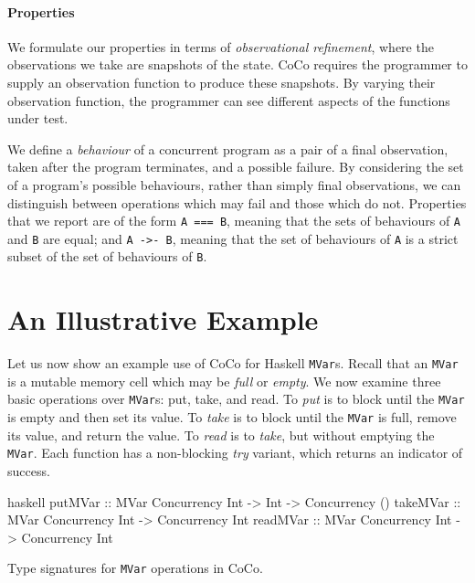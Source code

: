 \paragraph{Properties}
We formulate our properties in terms of \emph{observational
  refinement}\cite{he1986}, where the observations we take are
snapshots of the state.  CoCo requires the programmer to supply an
observation function to produce these snapshots.  By varying their
observation function, the programmer can see different aspects of the
functions under test.

We define a \emph{behaviour} of a concurrent program as a pair of a
final observation, taken after the program terminates, and a possible
failure.  By considering the set of a program's possible behaviours,
rather than simply final observations, we can distinguish between
operations which may fail and those which do not.  Properties that we
report are of the form \verb|A === B|, meaning that the sets of
behaviours of \verb|A| and \verb|B| are equal; and \verb|A ->- B|,
meaning that the set of behaviours of \verb|A| is a strict subset of
the set of behaviours of \verb|B|.

\section{An Illustrative Example}
\label{sec:coco-example}

Let us now show an example use of CoCo for Haskell \verb|MVar|s.
Recall that an \verb|MVar| is a mutable memory cell which may be
\emph{full} or \emph{empty}.  We now examine three basic operations
over \verb|MVar|s: put, take, and read.  To \emph{put} is to block
until the \verb|MVar| is empty and then set its value.  To \emph{take}
is to block until the \verb|MVar| is full, remove its value, and
return the value.  To \emph{read} is to \emph{take}, but without
emptying the \verb|MVar|.  Each function has a non-blocking \emph{try}
variant, which returns an indicator of success.

\begin{listing}
\centering
\begin{cminted}{haskell}
putMVar  :: MVar Concurrency Int -> Int -> Concurrency ()
takeMVar :: MVar Concurrency Int -> Concurrency Int
readMVar :: MVar Concurrency Int -> Concurrency Int
\end{cminted}
\caption{Type signatures for \texttt{MVar} operations in CoCo.}\label{lst:mvar_types}
\end{listing}

